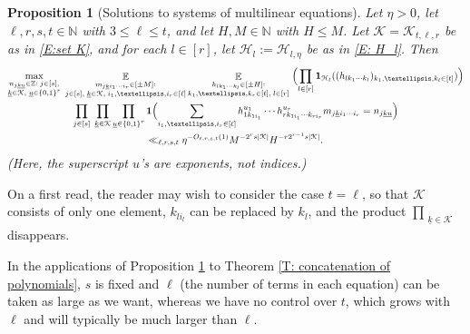\documentclass[11pt]{amsart}
\newtheorem{proposition}[lemma]{Proposition}
\theoremstyle{definition}
\DeclareMathOperator*{\E}{\mathbb{E}}
\newcommand{\N}{{\mathbb N}}
\newcommand{\Z}{{\mathbb Z}}
\newcommand{\CH}{{\mathcal H}}
\newcommand{\CK}{{\mathcal K}}
\newcommand{\uk}{{\underline{k}}}
\newcommand{\uu}{{\underline{u}}}
\newcommand{\Bigbrac}[1]{\Bigl( #1 \Bigr)}
\begin{document}
\begin{proposition}[Solutions to systems of multilinear equations]\label{P: systems of multilinear equations}
    Let $\eta>0$, let $\ell, r, s, t\in\N$ with $3\leq\ell\leq t$, and let $H, M\in\N$ with $H\leq M$. Let $\CK = \CK_{t, \ell, r}$ be as in \eqref{E:set K}, and for each $l\in[r]$, let $\CH_l:=\CH_{l,\eta}$ be as in \eqref{E: H_l}. Then 
        \begin{multline*}
        \max_{\substack{n_{j\uk\uu}\in\Z:\; j\in[s],\\ \uk\in\CK,\; \uu\in\{0,1\}^r}}\;\E_{\substack{m_{j\uk i_1\cdots i_r}\in[\pm M]:\\ j\in[s],\; \uk\in\CK,\; i_1, \ldots,  i_r\in[\ell]}}
                \E_{\substack{h_{lk_{1}\cdots k_{l}}\in[\pm H]:\\  k_1, \ldots, k_r\in[t],\; l\in[r]}}\; \Bigbrac{\prod_{l\in[r]}\mathbf{1}_{\CH_l}((h_{lk_{1}\cdots k_{l}})_{k_1, \ldots, k_l \in [t]})}\\
        \prod_{j\in[s]}\; \prod_{\substack{\uk\in\CK}}\prod_{\substack{\uu\in\{0,1\}^r
        }} \mathbf{1}\Bigbrac{\sum\limits_{i_1, \ldots, i_r\in[\ell]} h_{1k_{1i_1}}^{u_1} \cdots h_{rk_{1i_1}\cdots k_{ri_r}}^{u_r}m_{j\uk i_1\cdots i_r} = n_{j\uk\uu}}\\
        \ll_{\ell, r, s, t} \eta^{-O_{\ell, r, s,t}(1)}  M^{-2^{r}s|\CK|}H^{-r2^{r-1}s|\CK|}.
    \end{multline*}
(Here, the superscript $u$'s are exponents, not indices.)

\end{proposition}

On a first read, the reader may wish to consider the case $t=\ell$, so that $\CK$ consists of only one element, $k_{li_l}$ can be replaced by $k_l$, and the product $\prod_{\substack{\uk\in\CK}}$ disappears.


In the applications of Proposition \ref{P: systems of multilinear equations} to Theorem \ref{T: concatenation of polynomials}, $s$ is fixed and $\ell$ (the number of terms in each equation) can be taken as large as we want, whereas we have no control over $t$, which grows with $\ell$ and will typically be much larger than $\ell$. 
\end{document}
